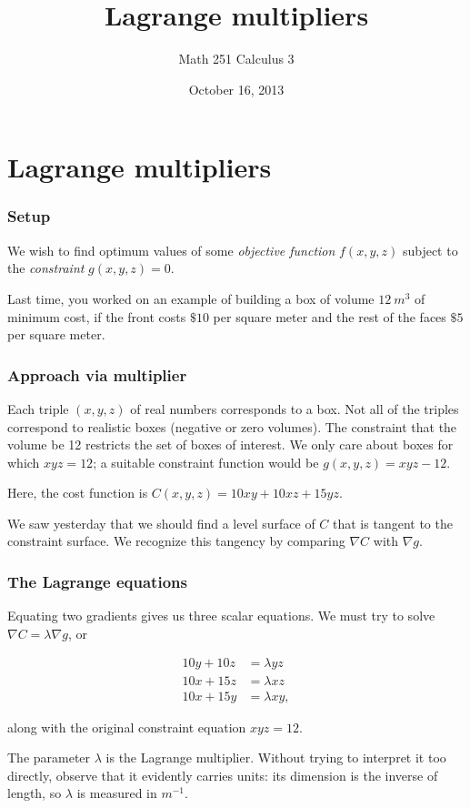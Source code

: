 \documentclass[11pt,ignorenonframetext,aspectratio=169,xcolor={svgnames}]{beamer}
\title{Lagrange multipliers}
\author{Math 251 Calculus 3}
\date{October 16, 2013}
\begin{document}
\frame{\titlepage}

\section{Lagrange multipliers}

\begin{frame}\frametitle{Setup}

We wish to find optimum values of some \emph{objective function}
$f(x,y,z)$ subject to the \emph{constraint} $g(x,y,z) = 0$.

Last time, you worked on an example of building a box of volume
$\SI{12}{m^3}$ of minimum cost, if the front costs $\$10$ per square
meter and the rest of the faces $\$5$ per square meter.

\end{frame}

\begin{frame}\frametitle{Approach via multiplier}

Each triple $(x,y,z)$ of real numbers corresponds to a box. Not all of
the triples correspond to realistic boxes (negative or zero volumes).
The constraint that the volume be 12 restricts the set of boxes of
interest. We only care about boxes for which $xyz = 12$; a suitable
constraint function would be $g(x,y,z) = xyz - 12$.

Here, the cost function is $C(x, y, z) = 10xy + 10xz + 15yz$.

We saw yesterday that we should find a level surface of $C$ that is
tangent to the constraint surface. We recognize this tangency by
comparing $\nabla C$ with $\nabla g$.

\end{frame}

\begin{frame}\frametitle{The Lagrange equations}

Equating two gradients gives us three scalar equations. We must try to
solve $\nabla C = \lambda \nabla g$, or

\begin{align*}
    10y + 10z &= \lambda yz \\
    10x + 15z &= \lambda xz \\
    10x + 15y &= \lambda xy,
\end{align*}

along with the original constraint equation $xyz = 12$.

The parameter $\lambda$ is the Lagrange multiplier. Without trying to
interpret it too directly, observe that it evidently carries units: its
dimension is the inverse of length, so $\lambda$ is measured in
$\si{m^{-1}}$.

\end{frame}
\end{document}
